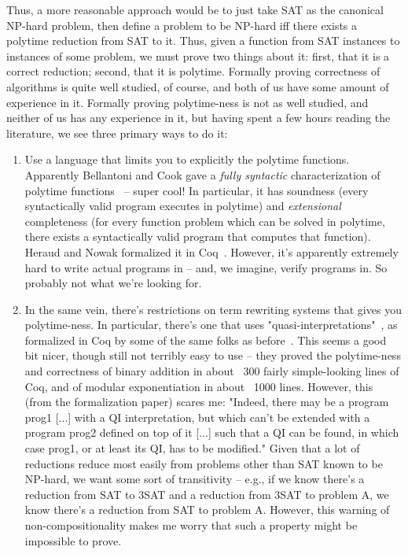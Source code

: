 \documentclass{article}
\begin{document}
Thus, a more reasonable approach would be to just take SAT as the canonical
NP-hard problem, then define a problem to be NP-hard iff there exists a polytime
reduction from SAT to it. Thus, given a function from SAT instances to instances
of some problem, we must prove two things about it: first, that it is a correct
reduction; second, that it is polytime. Formally proving correctness of
algorithms is quite well studied, of course, and both of us have some amount of
experience in it. Formally proving polytime-ness is not as well studied, and
neither of us has any experience in it, but having spent a few hours reading the
literature, we see three primary ways to do it:

\begin{enumerate}
\item Use a language that limits you to explicitly the polytime functions.
  Apparently Bellantoni and Cook gave a \emph{fully syntactic} characterization
  of polytime functions~\cite{recursion92} -- super cool! In particular, it has
  soundness (every syntactically valid program executes in polytime) and
  \emph{extensional} completeness (for every function problem which can be
  solved in polytime, there exists a syntactically valid program that computes
  that function). Heraud and Nowak formalized it in Coq~\cite{formalization11}.
  However, it's apparently extremely hard to write actual programs in -- and, we
  imagine, verify programs in. So probably not what we're looking for.

\item In the same vein, there's restrictions on term rewriting systems that
  gives you polytime-ness. In particular, there's one that uses
  "quasi-interpretations"~\cite{quasi11}, as formalized in Coq by some of the
  same folks as before~\cite{formal18}. This seems a good bit nicer, though
  still not terribly easy to use -- they proved the polytime-ness and
  correctness of binary addition in about ~300 fairly simple-looking lines of
  Coq, and of modular exponentiation in about ~1000 lines. However, this (from
  the formalization paper) scares me: "Indeed, there may be a program prog1
  [...] with a QI interpretation, but which can’t be extended with a program
  prog2 defined on top of it [...] such that a QI can be found, in which case
  prog1, or at least its QI, has to be modified." Given that a lot of reductions
  reduce most easily from problems other than SAT known to be NP-hard, we want
  some sort of transitivity -- e.g., if we know there's a reduction from SAT to
  3SAT and a reduction from 3SAT to problem A, we know there's a reduction from
  SAT to problem A. However, this warning of non-compositionality makes me worry
  that such a property might be impossible to prove.


\end{enumerate}
\end{document}
